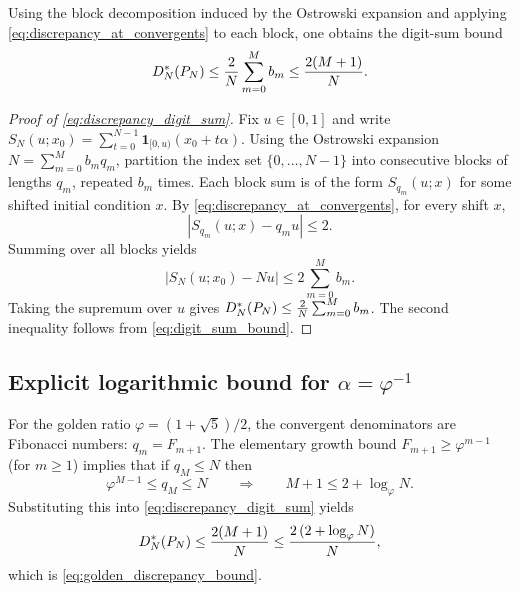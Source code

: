 Using the block decomposition induced by the Ostrowski expansion and applying \eqref{eq:discrepancy_at_convergents} to each block, one obtains the digit-sum bound
\begin{equation}
\label{eq:discrepancy_digit_sum}
D_N^\ast(P_N)\le \frac{2}{N}\sum_{m=0}^M b_m
\le \frac{2(M+1)}{N}.
\end{equation}

\begin{proof}[Proof of \eqref{eq:discrepancy_digit_sum}]
Fix $u\in[0,1]$ and write $S_N(u;x_0)=\sum_{t=0}^{N-1}\mathbf{1}_{[0,u)}(x_0+t\alpha)$.
Using the Ostrowski expansion $N=\sum_{m=0}^M b_m q_m$, partition the index set $\{0,\dots,N-1\}$ into consecutive blocks of lengths $q_m$, repeated $b_m$ times.
Each block sum is of the form $S_{q_m}(u;x)$ for some shifted initial condition $x$.
By \eqref{eq:discrepancy_at_convergents}, for every shift $x$,
\[
\left|S_{q_m}(u;x)-q_m u\right|\le 2.
\]
Summing over all blocks yields
\[
\left|S_N(u;x_0)-Nu\right|
\le
2\sum_{m=0}^M b_m.
\]
Taking the supremum over $u$ gives $D_N^\ast(P_N)\le \frac{2}{N}\sum_{m=0}^M b_m$.
The second inequality follows from \eqref{eq:digit_sum_bound}.
\end{proof}

\subsection{Explicit logarithmic bound for \texorpdfstring{$\alpha=\varphi^{-1}$}{alpha=1/phi}}
\label{app:explicit_log_bound}

For the golden ratio $\varphi=(1+\sqrt{5})/2$, the convergent denominators are Fibonacci numbers: $q_m=F_{m+1}$.
The elementary growth bound $F_{m+1}\ge \varphi^{m-1}$ (for $m\ge 1$) implies that if $q_M\le N$ then
\[
\varphi^{M-1}\le q_M\le N
\qquad\Rightarrow\qquad
M+1\le 2+\log_\varphi N.
\]
Substituting this into \eqref{eq:discrepancy_digit_sum} yields
\[
D_N^\ast(P_N)\le \frac{2(M+1)}{N}\le \frac{2\,(2+\log_\varphi N)}{N},
\]
which is \eqref{eq:golden_discrepancy_bound}.


